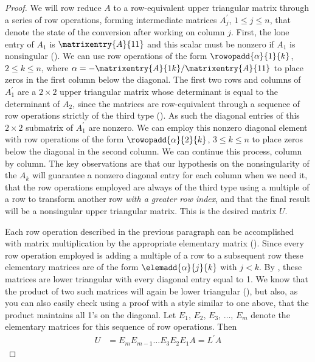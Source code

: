 \begin{proof}
We will row reduce $A$ to a row-equivalent upper triangular matrix through a series of row operations, forming intermediate matrices $A^\prime_j$, $1\leq j\leq n$, that denote the state of the conversion after working on column $j$.  First, the lone entry of $A_1$ is $\matrixentry{A}{11}$ and this scalar must be nonzero if $A_1$ is nonsingular ().  We can use row operations  of the form $\rowopadd{\alpha}{1}{k}$, $2\leq k\leq n$, where $\alpha=-\matrixentry{A}{1k}/\matrixentry{A}{11}$ to place zeros in the first column below the diagonal.  The first two rows and columns of $A^\prime_1$ are a $2\times 2$ upper triangular matrix whose determinant is equal to the determinant of $A_2$, since the matrices are row-equivalent through a sequence of row operations strictly of the third type ().  As such the diagonal entries of this $2\times 2$ submatrix of $A^\prime_1$ are nonzero.  We can employ this nonzero diagonal element with row operations of the form $\rowopadd{\alpha}{2}{k}$, $3\leq k\leq n$ to place zeros below the diagonal in the second column.  We can continue this process, column by column.  The key observations are that our hypothesis on the nonsingularity of the $A_k$ will guarantee a nonzero diagonal entry for each column when we need it, that the row operations employed are always of the third type using a multiple of a row to transform another row {\em with a greater row index}, and that the final result will be a nonsingular upper triangular matrix.  This is the desired matrix $U$.\par
%
Each row operation described in the previous paragraph can be accomplished with matrix multiplication by the appropriate elementary matrix ().  Since every row operation employed is adding a multiple of a row to a subsequent row these elementary matrices are of the form $\elemadd{\alpha}{j}{k}$ with $j<k$.  By , these matrices are lower triangular with every diagonal entry equal to 1.  We know that the product of two such matrices will again be lower triangular (), but also, as you can also easily check using a proof with a style similar to one above, that the product maintains all 1's on the diagonal.  Let $E_1,\,E_2,\,E_3,\,\dots,\,E_m$ denote the elementary matrices for this sequence of row operations.  Then
%
\begin{align*}
U&=E_mE_{m-1}\dots E_3E_2E_1A=L^{\prime}A
\end{align*}

\end{proof}
